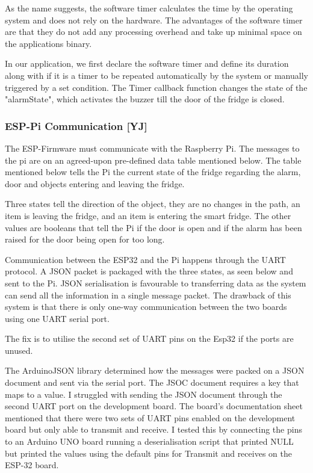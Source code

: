 As the name suggests, the software timer calculates the time by the operating system and does not rely on the hardware.
The advantages of the software timer are that they do not add any processing overhead and take up minimal space on the applications binary.

In our application, we first declare the software timer and define its duration along with if it is a timer to be repeated automatically by the system or manually triggered by a set condition.
The Timer callback function changes the state of the "alarmState", which activates the buzzer till the door of the fridge is closed.

\subsubsection{ESP-Pi Communication [YJ]}

The ESP-Firmware must communicate with the Raspberry Pi.
The messages to the pi are on an agreed-upon pre-defined data table mentioned below.
The table mentioned below tells the Pi the current state of the fridge regarding the alarm, door and objects entering and leaving the fridge.



Three states tell the direction of the object, they are no changes in the path, an item is leaving the fridge, and an item is entering the smart fridge.
The other values are booleans that tell the Pi if the door is open and if the alarm has been raised for the door being open for too long.

Communication between the ESP32 and the Pi happens through the UART protocol.
A JSON packet is packaged with the three states, as seen below and sent to the Pi.
JSON serialisation is favourable to transferring data as the system can send all the information in a single message packet.
The drawback of this system is that there is only one-way communication between the two boards using one UART serial port.

The fix is to utilise the second set of UART pins on the Esp32 if the ports are unused.

The ArduinoJSON library determined how the messages were packed on a JSON document and sent via the serial port.
The JSOC document requires a key that maps to a value.
I struggled with sending the JSON document through the second UART port on the development board.
The board's documentation sheet mentioned that there were two sets of UART pins enabled on the development board but only able to transmit and receive.
I tested this by connecting the pins to an Arduino UNO board running a deserialisation script that printed NULL but printed the values using the default pins for Transmit and receives on the ESP-32 board.

